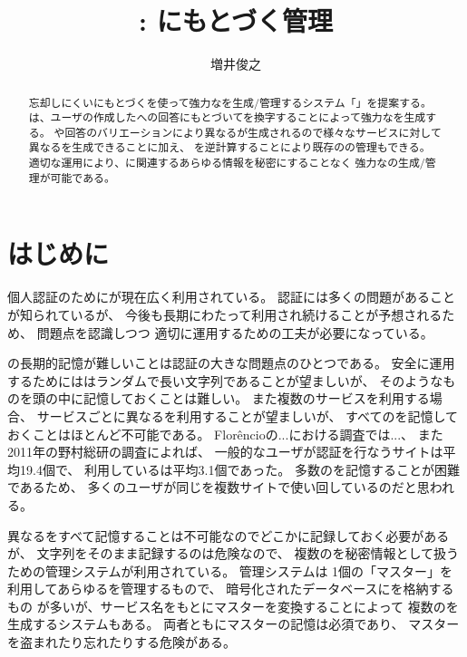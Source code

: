 \documentclass[twoside]{wiss}
\begin{document}
\title{{\EP}: {\EM}にもとづく{\PW}管理}

\author{増井俊之}

\begin{abstract}
忘却しにくい{\EM}にもとづく{\SQ}を使って強力な{\PW}を生成/管理するシステム「\textsf{\EP}」を提案する。
{\EP}は、ユーザの作成した{\SQ}への回答にもとづいて{\SS}を換字することによって強力な{\PW}を生成する。
{\SS}や回答のバリエーションにより異なる{\PW}が生成されるので様々なサービスに対して異なる{\PW}を生成できることに加え、
{\SS}を逆計算することにより既存の{\PW}の管理もできる。
適切な運用により、{\PW}に関連するあらゆる情報を秘密にすることなく
強力な{\PW}の生成/管理が可能である。
\end{abstract}

\maketitle

\section{はじめに}

個人認証のために{\PW}が現在広く利用されている。
{\PW}認証には多くの問題があることが知られているが\cite{増井_ユニマガ}、
今後も長期にわたって利用され続けることが予想されるため\cite{Herley:2009:PSS:1601990.1602010}、
問題点を認識しつつ
適切に運用するための工夫が必要になっている。

{\PW}の長期的記憶が難しいことは{\PW}認証の大きな問題点のひとつである。
安全に運用するためには{\PW}はランダムで長い文字列であることが望ましいが、
そのようなものを頭の中に記憶しておくことは難しい。
また複数のサービスを利用する場合、
サービスごとに異なる{\PW}を利用することが望ましいが、
すべての{\PW}を記憶しておくことはほとんど不可能である。
%
Flor\^{e}ncioの...における調査では...\cite{Florencio:2007:LSW:1242572.1242661}、
また2011年の野村総研の調査によれば、
一般的なユーザが{\PW}認証を行なうサイトは平均19.4個で、
利用している{\PW}は平均3.1個であった\cite{野村総研}。
多数の{\PW}を記憶することが困難であるため、
多くのユーザが同じ{\PW}を複数サイトで使い回しているのだと思われる。

異なる{\PW}をすべて記憶することは不可能なのでどこかに記録しておく必要があるが、
{\PW}文字列をそのまま記録するのは危険なので、
複数の{\PW}を秘密情報として扱うための{\PW}管理システムが利用されている。
{\PW}管理システムは
1個の「マスター{\PW}」を利用してあらゆる{\PW}を管理するもので、
暗号化されたデータベースに{\PW}を格納するもの%
\cite{OnePassword}%
\cite{Dashlane}%
\cite{ミルパス}%
\cite{LastPass}%
\cite{KeyPass}%
\cite{NortonIDSafe}%
\cite{IDManager}%
が多いが、サービス名をもとにマスター{\PW}を変換することによって
複数の{\PW}を生成するシステム\cite{SuperGenPass}もある。
両者ともにマスター{\PW}の記憶は必須であり、
マスター{\PW}を盗まれたり忘れたりする危険がある。
\end{document}
